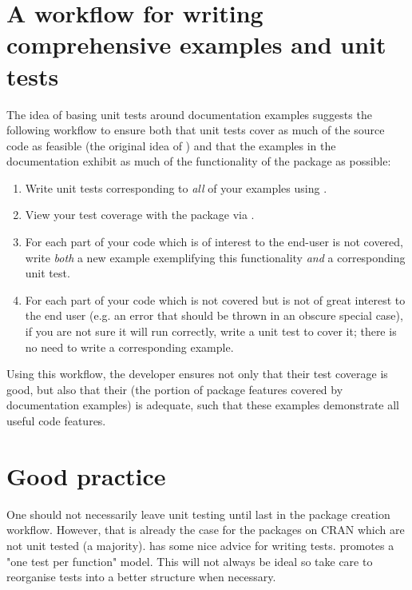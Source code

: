 \section{A workflow for writing comprehensive examples and unit tests}
The idea of basing unit tests around documentation examples suggests the following workflow to ensure both that unit tests cover as much of the source code as feasible (the original idea of ) and that the examples in the documentation exhibit as much of the functionality of the package as possible:
\begin{enumerate}
	\item Write unit tests corresponding to \emph{all} of your examples using .
	\item View your test coverage with the  package via .
	\item For each part of your code which is of interest to the end-user is not covered, write \emph{both} a new example exemplifying this functionality \emph{and} a corresponding unit test.
	\item For each part of your code which is not covered but is not of great interest to the end user (e.g. an error that should be thrown in an obscure special case), if you are not sure it will run correctly, write a unit test to cover it; there is no need to write a corresponding example.
\end{enumerate}
Using this workflow, the developer ensures not only that their test coverage is good, but also that their  (the portion of package features covered by documentation examples) is adequate, such that these examples demonstrate all useful code features. 


\section{Good practice}
One should not necessarily leave unit testing until last in the package creation workflow. However, that is already the case for the packages on CRAN which are not unit tested (a majority). \citet{r-pkgs} has some nice advice for writing tests.  promotes a "one test per function" model. This will not always be ideal so take care to reorganise tests into a better structure when necessary. 

